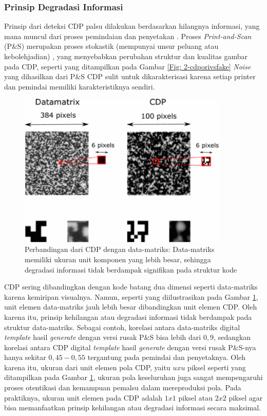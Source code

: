 \subsubsection{Prinsip Degradasi Informasi}
Prinsip dari deteksi CDP palsu dilakukan berdasarkan hilangnya informasi, yang mana muncul dari proses pemindaian dan penyetakan \cite{picard2004digital}.
Proses \emph{Print-and-Scan} (P\&S) merupakan proses stokastik (mempunyai unsur peluang atau kebolehjadian) \cite{phan2014document}, yang menyebabkan perubahan
struktur dan kualitas gambar pada CDP, seperti yang ditampilkan pada Gambar \ref{Fig: 2-cdporivsfake} \emph{Noise} yang dihasilkan dari P\&S CDP sulit untuk
dikarakterisasi \cite{picard2008security} karena setiap printer dan pemindai memiliki karakteristiknya sendiri.

\begin{figure}[h]
	\centering
	\includegraphics[width=10cm]{contents/chapter-2/2-datamatrixvscdp.png}
	\caption{Perbandingan dari CDP dengan data-matriks: Data-matriks memiliki ukuran unit komponen yang lebih besar, sehingga degradasi informasi tidak berdampak signifikan pada struktur kode \cite{PICARDCANCOPYDETECTIONPATTERN}}
	\label{Fig: 2-datamatrixvscdp}
\end{figure}

CDP sering dibandingkan dengan kode batang dua dimensi seperti data-matriks karena kemiripan visualnya. Namun, seperti yang diilustrasikan pada Gambar
\ref{Fig: 2-datamatrixvscdp}, unit elemen data-matriks jauh lebih besar dibandingkan unit elemen CDP. Oleh karena itu, prinsip kehilangan atau degradasi
informasi tidak berdampak pada struktur data-matriks. Sebagai contoh, korelasi antara data-matriks digital \emph{template} hasil \emph{generate} dengan versi
rusak P\&S bisa lebih dari $0,9$, sedangkan korelasi antara CDP digital \emph{template} hasil \emph{generate} dengan versi rusak P\&S-nya hanya sekitar
$0,45-0,55$ tergantung pada pemindai dan penyetaknya. Oleh karena itu, ukuran dari unit elemen pola CDP, yaitu $uxu$ piksel seperti yang ditampilkan pada
Gambar \ref{Fig: 2-datamatrixvscdp}, ukuran pola keseluruhan juga sangat mempengaruhi proses otentikasi dan kemampuan pemalsu dalam mereproduksi pola. Pada
praktiknya, ukuran unit elemen pada CDP adalah $1x1$ piksel atau $2x2$ piksel agar bisa memanfaatkan prinsip kehilangan atau degradasi informasi secara
maksimal.

